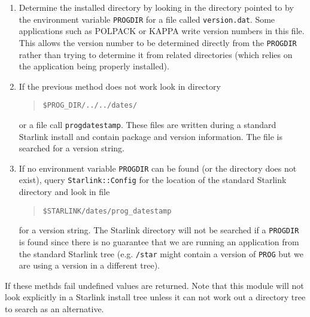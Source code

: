 \documentclass[twoside,11pt]{article}
\newenvironment{myquote}{\begin{quote}\begin{small}}{\end{small}\end{quote}}
\renewcommand{\_}{\texttt{\symbol{95}}}
\begin{document}
\begin{enumerate}
\item

Determine the installed directory by looking in the directory pointed
to by the environment variable \texttt{PROG\_DIR} for a file called
\texttt{version.dat}. Some applications such as POLPACK or KAPPA write
version numbers in this file. This allows the version number to be determined
directly from the \texttt{PROG\_DIR} rather than trying to determine it from
related directories (which relies on the application being properly
installed).

\item

If the previous method does not work look in directory

\begin{myquote}
\begin{verbatim}
$PROG_DIR/../../dates/
\end{verbatim}
\end{myquote} %

or a file call \texttt{prog\_datestamp}. These files are written during a
standard Starlink install and contain package and version information.  The
file is searched for a version string.

\item

  If no environment variable \texttt{PROG\_DIR} can be found (or the directory
  does not exist), query \texttt{Starlink::Config} for the location of the
  standard Starlink directory and look in file

\begin{myquote}
\begin{verbatim}
$STARLINK/dates/prog_datestamp
\end{verbatim}
\end{myquote} %

for a version string. The Starlink directory will not be searched if a
\texttt{PROG\_DIR} is found since there is no guarantee that we are running an
application from the standard Starlink tree (e.g. \texttt{/star} might contain
a version of \texttt{PROG} but we are using a version in a different tree).

\end{enumerate}


If these methds fail undefined values are returned. Note that
this module will not look explicitly in a Starlink install tree
unless it can not work out a directory tree to search as an alternative.
\end{document}
